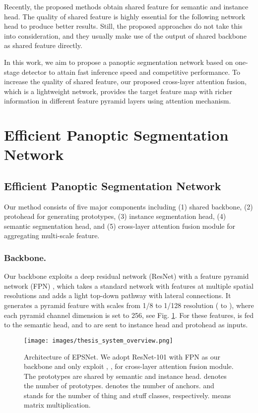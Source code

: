 \documentclass[runningheads]{llncs}
\begin{document}
Recently, the proposed methods obtain shared feature for semantic and instance head. The quality of shared feature is highly essential for the following network head to produce better results. Still, the proposed approaches do not take this into consideration, and they usually make use of the output of shared backbone as shared feature directly. 

In this work, we aim to propose a panoptic segmentation network based on one-stage detector to attain fast inference speed and competitive performance. To increase the quality of shared feature, our proposed cross-layer attention fusion, which is a lightweight network, provides the target feature map with richer information in different feature pyramid layers using attention mechanism.


\section{Efficient Panoptic Segmentation Network}
\subsection{Efficient Panoptic Segmentation Network}
Our method consists of five major components including (1) shared backbone, (2) protohead for generating prototypes, (3) instance segmentation head, (4) semantic segmentation head, and (5) cross-layer attention fusion module for aggregating multi-scale feature.

\subsubsection{Backbone.}  
Our backbone exploits a deep residual network (ResNet) \cite{He2016} with a feature pyramid network (FPN) \cite{Lin2017}, which takes a standard network with features at multiple spatial resolutions and adds a light top-down pathway with lateral connections. It generates a pyramid feature with scales from 1/8 to 1/128 resolution ( to ), where each pyramid channel dimension is set to 256, see Fig. \ref{fig:overview}. For these features,  is fed to the semantic head, and  to  are sent to instance head and protohead as inputs. 



\begin{figure}[tbh]
\centering
\texttt{[image: images/thesis\_system\_overview.png]}
\caption{Architecture of EPSNet. We adopt ResNet-101 \cite{He2016} with FPN \cite{Lin2017} as our backbone and only exploit , ,  for cross-layer attention fusion module. The prototypes are shared by semantic and instance head.  denotes the number of prototypes.  denotes the number of anchors.  and  stands for the number of thing and stuff classes, respectively.  means matrix multiplication. }
\label{fig:overview}
\end{figure}
\end{document}
